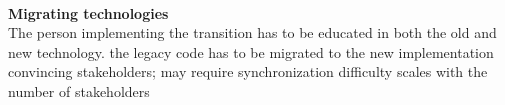 \ \\

\textbf{Migrating technologies} \\
The person implementing the transition has to be educated in both the old and new technology. 
the legacy code has to be migrated to the new implementation
convincing stakeholders; may require synchronization
difficulty scales with the number of stakeholders 